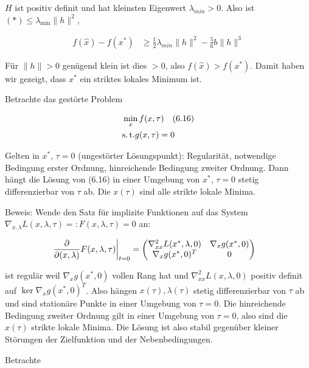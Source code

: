 $H$ ist positiv definit und hat kleinsten Eigenwert $\lambda_{min} > 0$. Also ist $(*) \leq \lambda_{\min} \|h\|^2$,

\begin{align*}
f(\hat x) - f(x^*) & \geq \frac 12 \lambda_{min} \|h\|^2 - \frac 56 b \|h\|^3
\end{align*}

Für $\|h\| > 0$ genügend klein ist dies $>0$, also $f(\hat x) > f(x^*)$. Damit haben wir gezeigt, dass $x^*$ ein striktes lokales Minimum ist.


Betrachte das gestörte Problem

\begin{align*}
&\min_x f(x, \tau) \quad (6.16) \\
&\text{s.\,t.} g(x,\tau) = 0 \\
\end{align*}

Gelten in $x^*$, $\tau = 0$ (ungestörter Lösungspunkt): Regularität, notwendige Bedingung erster Ordnung, hinreichende Bedingung zweiter Ordnung. Dann hängt die Lösung von (6.16) in einer Umgebung von $x^*$, $\tau=0$ stetig differenzierbar von $\tau$ ab. Die $x(\tau)$ sind alle strikte lokale Minima.

Beweis: Wende den Satz für implizite Funktionen auf das System $\nabla_{x,\lambda} L(x,\lambda,\tau) =: F(x,\lambda,\tau)=0$ an:

\begin{align*}
\left. \frac{\partial}{\partial (x,\lambda)} F(x,\lambda,\tau) \right|_{t=0} &= \begin{pmatrix} \nabla_{xx}^2 L(x^*,\lambda,0) & \nabla_x g(x^*, 0) \\ \nabla_x g(x^*, 0)^T & 0 \end{pmatrix}
\end{align*}

ist regulär weil $\nabla_x g(x^*, 0)$ vollen Rang hat und $\nabla_{xx}^2 L(x,\lambda,0)$ positiv definit auf $\ker \nabla_x g(x^*,0)^T$. Also hängen $x(\tau), \lambda(\tau)$ stetig differenzierbar von $\tau$ ab und sind stationäre Punkte in einer Umgebung von $\tau=0$. Die hinreichende Bedingung zweiter Ordnung gilt in einer Umgebung von $\tau=0$, also sind die $x(\tau)$ strikte lokale Minima. Die Lösung ist also stabil gegenüber kleiner Störungen der Zielfunktion und der Nebenbedingungen.



Betrachte

